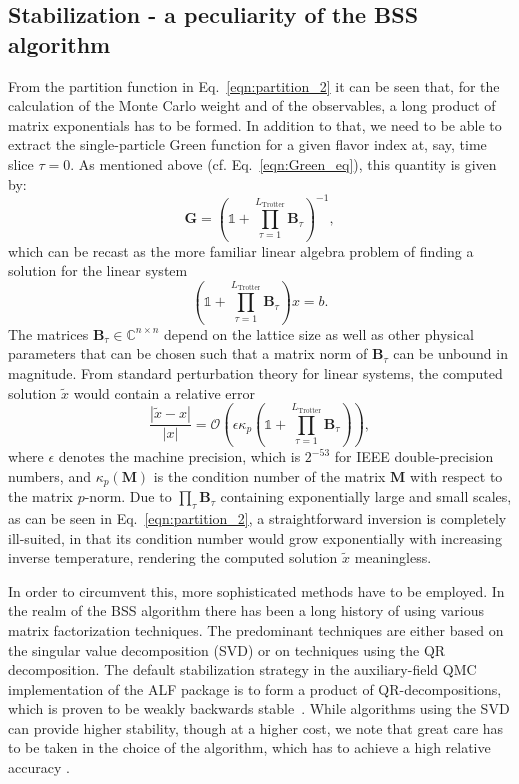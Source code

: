 \subsection{Stabilization - a peculiarity of the BSS algorithm}\label{sec:stable}
%
From the partition function in Eq.~\eqref{eqn:partition_2} it can be seen that, for the calculation of the Monte Carlo weight and of the observables, a long product of matrix exponentials has to be formed.
In addition to that, we need to be able to extract the single-particle Green function  for a given flavor index at, say, time slice $\tau = 0$.  As  mentioned above (cf. Eq.~\eqref{eqn:Green_eq}), this quantity is given by: 
\begin{equation}
\bm{G}= \left( \mathds{1} + \prod_{ \tau= 1}^{L_{\text{Trotter}}} \bm{B}_\tau \right)^{-1},
\end{equation}
which can be recast as the more familiar linear algebra problem of finding a solution for the linear system
\begin{equation}
\left(\mathds{1} + \prod_{\tau=1}^{L_{\text{Trotter}}} \bm{B}_\tau\right) x = b.
\end{equation}
The matrices $\bm{B}_\tau \in \mathbb{C}^{n\times n}$ depend on the lattice size as well as other physical parameters that can be chosen such that a matrix norm of $\bm{B}_\tau$ can be unbound in magnitude.
From standard perturbation theory for linear systems, the computed solution $\tilde{x}$ would 
contain a relative error
\begin{equation}
\frac{|\tilde{x} - x|}{|x|} = \mathcal{O}\left(\epsilon \kappa_p\left(\mathds{1} + \prod_{\tau=1}^{L_{\text{Trotter}}} \bm{B}_\tau\right)\right),
\end{equation}
where $\epsilon$ denotes the machine precision, which is $2^{-53}$ for IEEE double-precision numbers, and $\kappa_p(\bm{M})$ is the condition number of the matrix $\bm{M}$ with respect to the matrix $p$-norm. Due to $\prod_ \tau \bm{B}_\tau$ containing exponentially large and small scales, as can be seen in Eq.~\eqref{eqn:partition_2}, a straightforward inversion is completely ill-suited, in that its condition number would grow exponentially with increasing inverse temperature, rendering the computed solution $\tilde{x}$ meaningless.

In order to circumvent this, more sophisticated methods have to be employed.
In the realm of the BSS algorithm there has been a long history \cite{Loh1989, Sorella89, Assaad02,Loh2005, Bai2011, Bauer2020} of using various matrix factorization techniques.
The predominant techniques are either based on the singular value decomposition (SVD) or 
on techniques using the QR decomposition.
The default stabilization strategy in the auxiliary-field QMC implementation of the ALF package is to form a product of QR-decompositions, which is proven to be weakly backwards stable~\cite{Bai2011}. While algorithms using the SVD can provide higher stability, though at a higher cost, we note that great care has to be taken in the choice of the algorithm, which has to achieve a high relative accuracy \cite{Demmel1992, Dongarra2018}.

